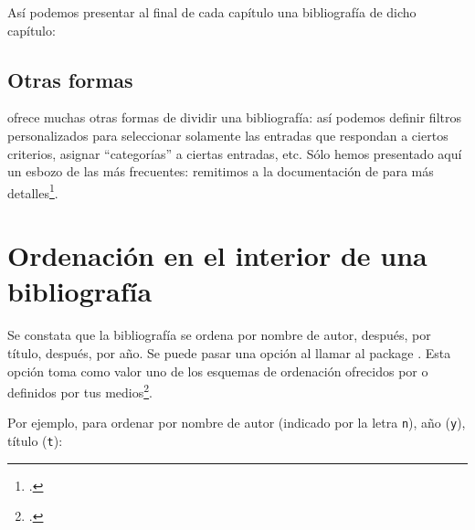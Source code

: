 Así podemos presentar al final de cada capítulo una bibliografía de dicho capítulo:


\subsection{Otras formas}

 ofrece muchas otras formas de dividir una bibliografía: así podemos definir filtros personalizados para seleccionar solamente las entradas que respondan a ciertos criterios, asignar \enquote{categorías} a ciertas entradas, etc. Sólo hemos presentado aquí un esbozo de las más frecuentes: remitimos a la documentación de  para más detalles\footcite{biblatex_bibliographycommands}.



\section{Ordenación en el interior de una bibliografía}

Se constata que la bibliografía se ordena por nombre de autor, después, por título, después, por año. Se puede pasar una opción  al llamar al  package . Esta opción toma como valor uno de los esquemas de ordenación ofrecidos por  o definidos por tus medios\footcites[Para los esquemas de ordenación estándar, véase][]{biblatex_tri}[para los esquemas personalizados, véase][]{biblatex_triperso}.

Por ejemplo, para ordenar por nombre de autor (indicado por la letra \verb|n|), año (\verb|y|), título (\verb|t|):

